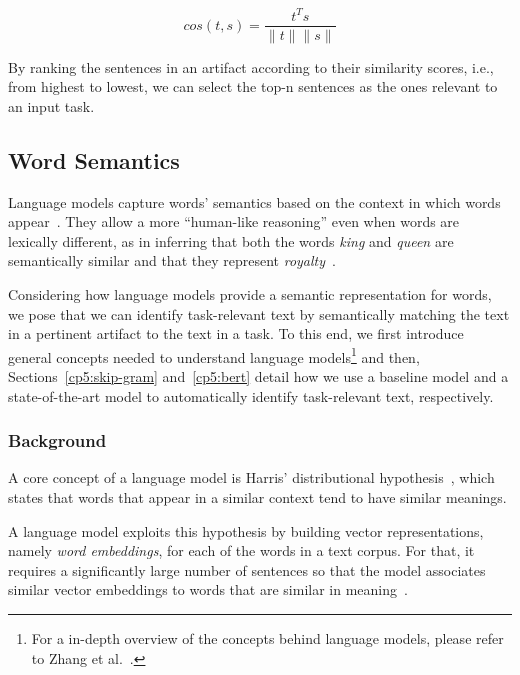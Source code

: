 \begin{equation}
    cos(t,s) = \frac{t^Ts}{\|t\| \|s\|}
    \label{eq:lex-sim}
\end{equation}
\smallskip

By ranking the sentences in an artifact according to their similarity scores, i.e., from highest to lowest,
we can  select the top-n sentences as the ones relevant to an input task.




\subsection{Word Semantics}


Language models capture words' semantics based on the context in which words appear~\cite{harris1954distributional}.
They allow a more ``human-like reasoning'' even when words are lexically different, as in 
inferring that both the words \textit{king} and \textit{queen} are semantically similar and that they represent \textit{royalty}~\cite{Mikolov2013}.


Considering how language models provide a semantic representation for words, we pose that we can identify task-relevant text by semantically matching the text in a pertinent artifact to the text in a task.
To this end, we first introduce general concepts needed to understand language models\footnote{
    For a in-depth overview of the concepts behind language models, please refer to Zhang et al.~\cite{zhang2021deep-learning}.
} and then, 
Sections~\ref{cp5:skip-gram} and~\ref{cp5:bert}
detail how we use a baseline model and 
a state-of-the-art model to automatically identify task-relevant text, respectively.





\subsubsection{Background}


A core concept of a language model is Harris' distributional hypothesis~\cite{harris1954distributional}, which states that words that appear in a similar context tend to have similar meanings.


A language model exploits this hypothesis by building vector representations, namely \textit{word embeddings}, for each of the words in a text corpus.
For that, it requires a significantly large number of sentences so that
the model associates similar vector embeddings to words that are similar in meaning~\cite{Ye2016}. 

